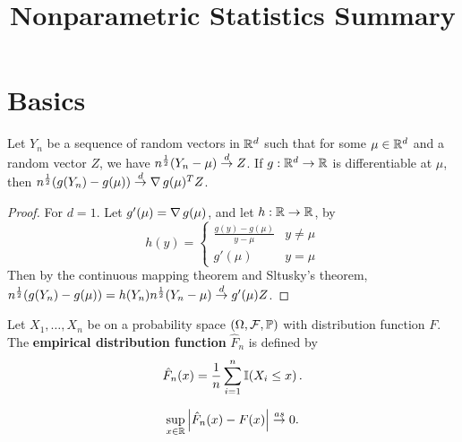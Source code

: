 

\title{Nonparametric Statistics Summary}



\maketitle

\section{Basics}
\begin{thm}
  Let $Y_{n}$ be a sequence of random vectors in $\mathbb{R}^{d}$ such that
  for some $\mu \in \mathbb{R}^{d}$ and a random vector $Z$, we have
  $n^{\frac{1}{2}}(Y_{n} - \mu) \overset{d}{\rightarrow} Z$.  If $g: \mathbb{R}^{d} \rightarrow \mathbb{R}$
  is differentiable at $\mu$, then $n^{\frac{1}{2}}(g(Y_{n}) - g(\mu))
  \overset{d}{\rightarrow} \operatorname{\nabla} g(\mu)^{T} Z$.
\end{thm}
\begin{proof}
  For $d = 1$.  Let $g'(\mu) = \operatorname{\nabla} g(\mu)$, and let $h: \mathbb{R}
  \rightarrow \mathbb{R}$, by
  \begin{equation}
    \label{eq:134}
    h(y) =
    \begin{cases}
      \frac{g(y) - g(\mu)}{y - \mu}  & y \neq \mu \\
      g'(\mu) & y = \mu
    \end{cases}
  \end{equation}  Then by the continuous mapping theorem and Sltusky's
  theorem, $n^{\frac{1}{2}}(g(Y_{n}) - g(\mu)) = h(Y_{n})
  n^{\frac{1}{2}}(Y_{n} - \mu) \overset{d}{\rightarrow} g'(\mu) Z$.
\end{proof}

Let $X_{1}, \dots, X_{n}$ be \iid on a probability space $(\Omega,
\mathcal{F}, \Prob)$ with distribution function $F$.  The
\textbf{empirical distribution function} $\hat F_{n}$ is defined by
\begin{equation}
  \label{eq:1}
  \hat F_{n}(x) = \frac{1}{n} \sum_{i=1}^{n} \I{X_{i} \leq x}.
\end{equation}

\begin{thm}
  \label{defn:Introduction:2}
  \begin{equation}
    \label{eq:2}
    \sup_{x \in \mathbb{R}} \left| \hat F_{n}(x) - F(x) \right| \overset{as}{\rightarrow} 0.
  \end{equation}
\end{thm}

